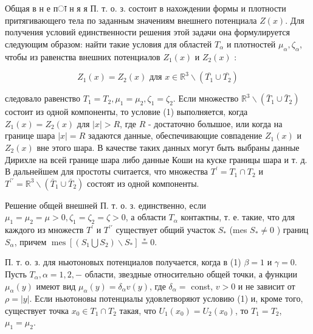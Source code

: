 \documentclass[10pt]{article}
\begin{document}
Общая в н е пा н я я П. т. о. з. состоит в нахождении формы и плотности притягивающего тела по заданным значениям внешнего потенциала $Z(x)$. Для получения условий единственности решения этой задачи она формулируется следующим образом: найти такие условия для областей $T_{\alpha}$ и плотностей $\mu_{\alpha}, \zeta_{\alpha}$, чтобы из равенства внешних потенциалов $Z_{1}(x)$ и $Z_{2}(x)$ :



\[

Z_{1}(x)=Z_{2}(x) \text { для } x \in \mathbb{R}^{3} \backslash\left(\overline{T_{1}} \cup \overline{T_{2}}\right)

\]



следовало равенство $T_{1}=T_{2}, \mu_{1}=\mu_{2}, \zeta_{1}=\zeta_{2}$. Если множество $\mathbb{R}^{3} \backslash\left(\bar{T}_{1} \cup \bar{T}_{2}\right)$ состоит из одной компоненты, то условие (1) выполняется, когда $Z_{1}(x)=Z_{2}(x)$ для $|x|>R$, где $R$ - достаточно болышое, или когда на границе шара $|x|=R$ задаются данные, обеспечивающие совпадение $Z_{1}(x)$ и $Z_{2}(x)$ вне этого шара. В качестве таких данных могут быть выбраны данные Дирихле на всей границе шара либо данные Коши на куске границы шара и т. д. В дальнейшем для простоты считается, что множества $T^{\prime}=T_{1} \cap T_{2}$ и $T^{\prime \prime}=\mathbb{R}^{3} \backslash\left(\bar{T}_{1} \cup \bar{T}_{2}\right)$ состоят из одной компоненты.



Решение общей внешней П. т. о. з. единственно, если $\mu_{1}=\mu_{2}=\mu>0, \zeta_{1}=\zeta_{2}=\zeta>0$, а области $T_{\alpha}$ контактны, т. е. такие, что для каждого из множеств $T^{\prime}$ и $T^{\prime \prime}$ существует общий участок $S_{*}$ (mes $S_{*} \neq 0$ ) границ $S_{\alpha}$, причем $\operatorname{mes}\left[\left(S_{1} \bigcup S_{2}\right) \backslash S_{*}\right] \stackrel{*}{=} 0$.



П. т. о. з. для ньютоновых потенциалов получается, когда в (1) $\beta=1$ и $\gamma=0$. Пусть $T_{\alpha}, \alpha=1,2,-$ области, звездные относительно общей точки, а функции $\mu_{\alpha}(y)$ имеют вид $\mu_{\alpha}(y)=\delta_{\alpha} v(y)$, где $\delta_{\alpha}=$ const, $v>0$ и не зависит от $\rho=|y|$. Если ньютоновы потенциалы удовлетворяют условию (1) и, кроме того, существует точка $x_{0} \in T_{1} \cap T_{2}$ такая, что $U_{1}\left(x_{0}\right)=U_{2}\left(x_{0}\right)$, то $T_{1}=T_{2}$, $\mu_{1}=\mu_{2}$.
\end{document}
